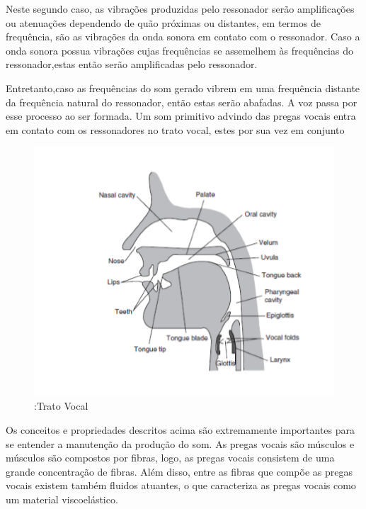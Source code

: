	Neste segundo caso, as vibrações produzidas pelo ressonador serão ampliﬁcações ou atenuações dependendo de quão próximas ou distantes, em termos de frequência, são as vibrações da onda sonora em contato com o ressonador. Caso a onda sonora possua vibrações cujas frequências se assemelhem às frequências do ressonador,estas então serão ampliﬁcadas pelo ressonador.
	
	Entretanto,caso as frequências do som gerado vibrem em uma frequência distante da frequência natural do ressonador, então estas serão abafadas. A voz passa por esse processo ao ser formada. Um som primitivo advindo das pregas vocais entra em contato com os ressonadores no trato vocal, estes por sua vez em conjunto

	\begin{figure}
		\centering
		\includegraphics[scale=0.5]{tratoVocal}
		\caption{:Trato Vocal~\cite{Foundation1}}
		\label{fig:tratoVocal}
	\end{figure}		
	

	Os conceitos e propriedades descritos acima são extremamente importantes para se entender a manutenção da produção do som. As pregas vocais são músculos e músculos são compostos por ﬁbras, logo, as pregas vocais consistem de uma grande concentração de ﬁbras. Além disso, entre as ﬁbras que compõe as pregas vocais existem também ﬂuidos atuantes, o que caracteriza as pregas vocais como um material viscoelástico.
	
